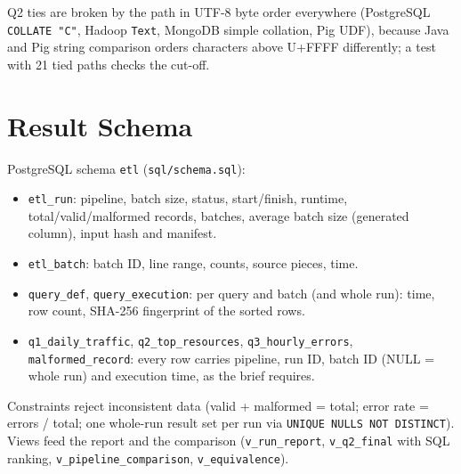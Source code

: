 \documentclass[conference]{IEEEtran}
\newcommand{\code}[1]{\texttt{\small #1}}
\begin{document}
Q2 ties are broken by the path in UTF-8 byte order everywhere (PostgreSQL \code{COLLATE "C"},
Hadoop \code{Text}, MongoDB simple collation, Pig UDF), because Java and Pig string comparison
orders characters above U+FFFF differently; a test with 21 tied paths checks the cut-off.

\section{Result Schema}
PostgreSQL schema \code{etl} (\code{sql/schema.sql}):
\begin{itemize}
\item \code{etl\_run}: pipeline, batch size, status, start/finish, runtime, total/valid/malformed
  records, batches, average batch size (generated column), input hash and manifest.
\item \code{etl\_batch}: batch ID, line range, counts, source pieces, time.
\item \code{query\_def}, \code{query\_execution}: per query and batch (and whole run): time, row
  count, SHA-256 fingerprint of the sorted rows.
\item \code{q1\_daily\_traffic}, \code{q2\_top\_resources}, \code{q3\_hourly\_errors},
  \code{malformed\_record}: every row carries pipeline, run ID, batch ID (NULL = whole run) and
  execution time, as the brief requires.
\end{itemize}
Constraints reject inconsistent data (valid + malformed = total; error rate = errors / total;
one whole-run result set per run via \code{UNIQUE NULLS NOT DISTINCT}). Views feed the report and
the comparison (\code{v\_run\_report}, \code{v\_q2\_final} with SQL ranking,
\code{v\_pipeline\_comparison}, \code{v\_equivalence}).
\end{document}
